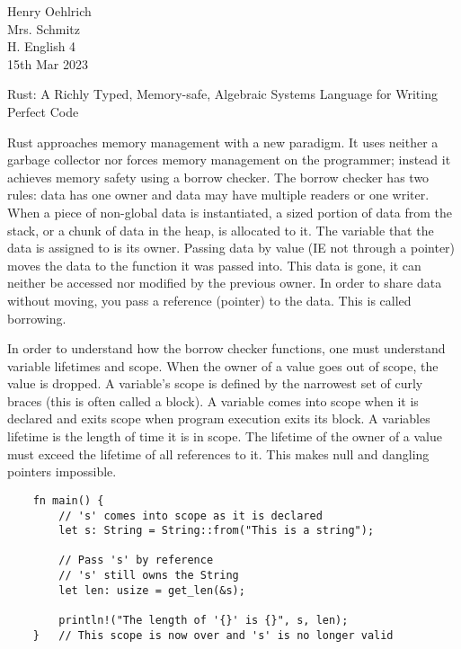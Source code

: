 \documentclass[12pt]{article}
\author{Henry Oehlrich}
\begin{document}
\begin{flushleft}
Henry Oehlrich \\
Mrs. Schmitz \\
H. English 4 \\
15th Mar 2023 \\
\begin{center}
Rust: A Richly Typed, Memory-safe, Algebraic Systems Language for Writing Perfect Code
\end{center}
\setlength{\parindent}{0.5in}


Rust approaches memory management with a new paradigm. It uses neither a
garbage collector nor forces memory management on the programmer; instead it
achieves memory safety using a borrow checker. The borrow checker has two
rules: data has one owner and data may have multiple readers or one writer.
When a piece of non-global data is instantiated, a sized portion of data from
the stack, or a chunk of data in the heap, is allocated to it. The variable
that the data is assigned to is its owner. Passing data by value (IE not
through a pointer) moves the data to the function it was passed into. This data
is gone, it can neither be accessed nor modified by the previous owner. In
order to share data without moving, you pass a reference (pointer) to the data.
This is called borrowing. 

In order to understand how the borrow checker functions, one must understand
variable lifetimes and scope. When the owner of a value goes out of scope, the
value is dropped. A variable's scope is defined by the narrowest set of curly
braces (this is often called a block). A variable comes into scope when it is
declared and exits scope when program execution exits its block. A variables
lifetime is the length of time it is in scope. The lifetime of the owner of a
value must exceed the lifetime of all references to it. This makes null and
dangling pointers impossible.

\singlespacing{}
\begin{verbatim}
    fn main() {
        // 's' comes into scope as it is declared
        let s: String = String::from("This is a string");

        // Pass 's' by reference
        // 's' still owns the String
        let len: usize = get_len(&s);

        println!("The length of '{}' is {}", s, len);
    }   // This scope is now over and 's' is no longer valid


\end{verbatim}
\end{flushleft}
\end{document}

